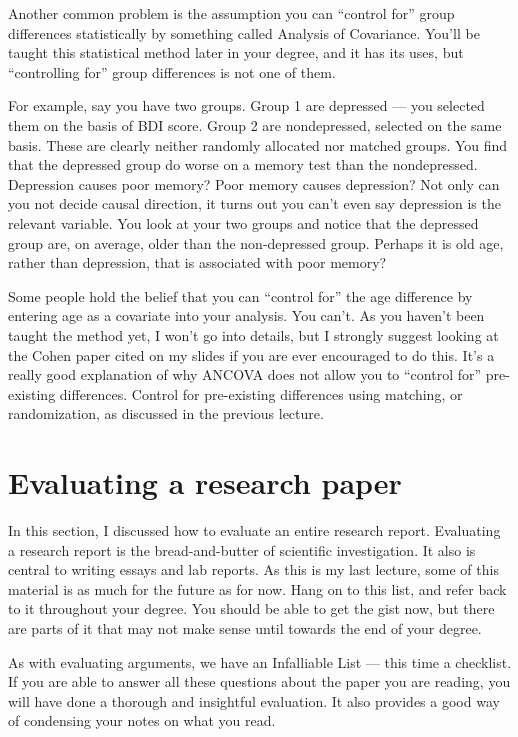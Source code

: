 \documentclass[12pt]{article}
\begin{document}
Another common problem is the assumption you can ``control for'' group
differences statistically by something called Analysis of
Covariance. You'll be taught this statistical method later in your
degree, and it has its uses, but ``controlling for'' group differences
is not one of them.

For example, say you have two groups. Group 1 are depressed --- you
selected them on the basis of BDI score. Group 2 are nondepressed,
selected on the same basis. These are clearly neither randomly
allocated nor matched groups. You find that the depressed group do
worse on a memory test than the nondepressed. Depression causes poor
memory? Poor memory causes depression? Not only can you not decide
causal direction, it turns out you can't even say depression is the
relevant variable. You look at your two groups and notice that the
depressed group are, on average, older than the non-depressed
group. Perhaps it is old age, rather than depression, that is
associated with poor memory?

Some people hold the belief that you can ``control for'' the age
difference by entering age as a covariate into your analysis. You
can't. As you haven't been taught the method yet, I won't go into
details, but I strongly suggest looking at the Cohen paper cited on my
slides if you are ever encouraged to do this. It's a really good
explanation of why ANCOVA does not allow you to ``control for''
pre-existing differences. Control for pre-existing differences using
matching, or randomization, as discussed in the previous lecture.

\section{Evaluating a research paper}

In this section, I discussed how to evaluate an entire research
report. Evaluating a research report is the bread-and-butter of
scientific investigation. It also is central to writing essays and lab
reports. As this is my last lecture, some of this material is
as much for the future as for now. Hang on to this list, and refer
back to it throughout your degree. You should be able to get the gist
now, but there are parts of it that may not make sense until towards
the end of your degree.

As with evaluating arguments, we have an Infalliable List --- this
time a checklist. If you are able to answer all these questions about
the paper you are reading, you will have done a thorough and
insightful evaluation. It also provides a good way of condensing your
notes on what you read.
\end{document}

